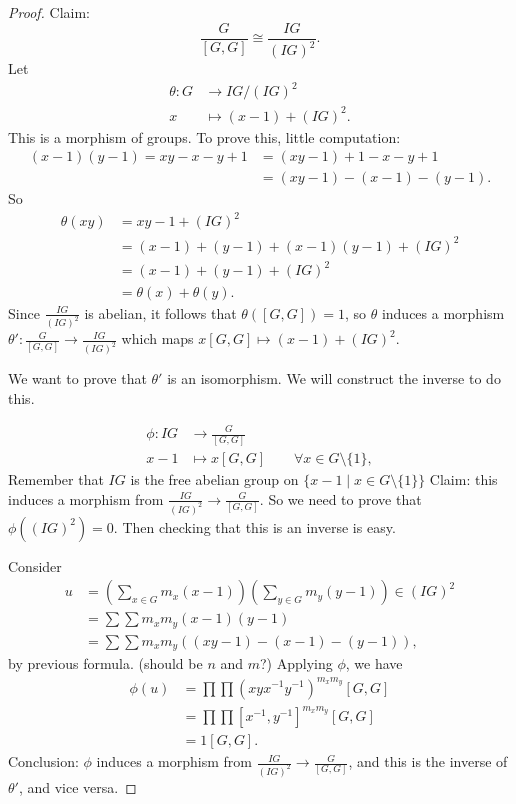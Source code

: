\begin{proof}
    Claim:
    \[
        \frac{G}{[G,G]} \cong \frac{IG}{(IG)^2}
    .\] 
    Let
    \begin{align*}
        \theta: G &\longrightarrow IG / (IG)^2 \\
        x &\longmapsto (x-1) + (IG)^2
    .\end{align*}
    This is a morphism of groups. To prove this, little computation:
    \begin{align*}
        (x-1)(y-1) = xy - x -y + 1 &= (xy-1) + 1-x-y+1\\
                                   &= (xy-1) - (x-1) - (y-1)
    .\end{align*} 
    So
    \begin{align*}
        \theta(xy) &= xy - 1 + (IG)^2\\
                   &= (x-1) + (y-1) + (x-1)(y-1) + (IG)^2\\
                   &= (x-1) + (y-1) + (IG)^2\\
                   &= \theta(x) + \theta(y)
    .\end{align*} 
    Since $\frac{IG}{(IG)^2}$ is abelian, it follows that $\theta([G,G]) = 1$, so  $\theta$ induces a morphism  $\theta': \frac{G}{[G,G]} \to  \frac{IG}{(IG)^2}$ which maps $x[G,G] \mapsto (x-1) + (IG)^2$.

    We want to prove that $\theta'$ is an isomorphism.
    We will construct the inverse to do this.
    
     \begin{align*}
         \phi: IG &\longrightarrow \frac{G}{[G,G]} \\
         x-1 &\longmapsto x[G,G] \qquad \forall x \in G \setminus \{1\} 
    ,\end{align*}
    Remember that $IG$ is the free abelian group on $\{ x - 1  \mid  x \in G \setminus \{1\} \} $
    Claim: this induces a morphism from $\frac{IG}{(IG)^2} \to  \frac{G}{[G,G]}$.
    So we need to prove that $\phi((IG)^2) = 0$. Then checking that this is an inverse is easy.

    Consider  
    \begin{align*}
        u &= \left(\sum_{x \in G} m_x (x-1)\right) \left(\sum_{y \in G} m_y (y-1)\right) \in (IG)^2\\
          &= \sum \sum m_x m_y (x-1)(y-1)\\
          &= \sum \sum m_x m_y ((xy-1) - (x-1) - (y-1))
    ,\end{align*} 
    by previous formula.
    (should be $n$ and  $m$?)
    Applying $\phi$, we have
     \begin{align*}
         \phi(u) &= \prod \prod \left( xy  x ^{-1} y^{-1}    \right) ^{m_x m_y}[G,G]\\
                 &= \prod \prod [x^{-1}, y^{-1}] ^{m_x m_y}[G,G]\\
                 &= 1 [G,G]
    .\end{align*} 
    Conclusion:  $\phi$ induces a morphism from  $\frac{IG}{(IG)^2} \to \frac{G}{[G,G]}$, and this is the inverse of $\theta'$, and vice versa.
\end{proof}

